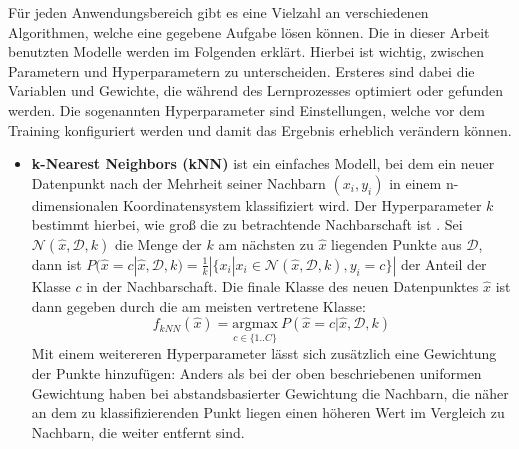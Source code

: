 Für jeden Anwendungsbereich gibt es eine Vielzahl an verschiedenen Algorithmen, welche eine gegebene Aufgabe
 lösen können. Die in dieser Arbeit benutzten Modelle werden im Folgenden erklärt. Hierbei ist wichtig, zwischen
 Parametern und Hyperparametern zu unterscheiden. Ersteres sind dabei die Variablen und Gewichte, die während
 des Lernprozesses optimiert oder gefunden werden. Die sogenannten Hyperparameter sind Einstellungen, welche
 vor dem Training konfiguriert werden und damit das Ergebnis erheblich verändern können.

\begin{itemize}

   \item \textbf{k-Nearest Neighbors (kNN)} ist ein einfaches Modell, bei dem ein neuer Datenpunkt nach der
    Mehrheit seiner Nachbarn $(x_i, y_i)$ in einem n-dimensionalen Koordinatensystem klassifiziert wird. Der
    Hyperparameter $k$ bestimmt hierbei, wie groß die zu betrachtende Nachbarschaft ist \cite{mlKNN}. Sei
            $\mathcal{N}(\hat{x}, \mathcal{D}, k)$
    die Menge der $k$ am nächsten zu $\hat{x}$ liegenden Punkte aus $\mathcal{D}$, dann ist
            $P(\hat{x}=c|\hat{x}, \mathcal{D}, k) = \frac{1}{k} |\{x_i | x_i \in \mathcal{N}(\hat{x}, \mathcal{D}, k), y_i=c\}|$
    der Anteil der Klasse $c$ in der Nachbarschaft. Die finale Klasse des neuen Datenpunktes $\hat{x}$ ist dann
    gegeben durch die am meisten vertretene Klasse:
    \begin{equation}
            f_{kNN}(\hat{x}) = \underset{c \in \{1..C\}}{\mathrm{argmax}}\ P(\hat{x}=c|\hat{x}, \mathcal{D}, k)
    \end{equation}
    Mit einem weitereren Hyperparameter lässt sich zusätzlich eine Gewichtung der Punkte hinzufügen: Anders als
    bei der oben beschriebenen uniformen Gewichtung haben bei abstandsbasierter Gewichtung die Nachbarn, die näher
    an dem zu klassifizierenden Punkt liegen einen höheren Wert im Vergleich zu Nachbarn, die weiter entfernt sind.


\end{itemize}
